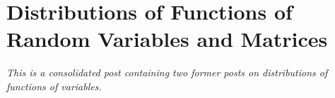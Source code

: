 \section{Distributions of Functions of Random Variables and Matrices}

\emph{This is a consolidated post containing two former posts on distributions of functions of variables.}




